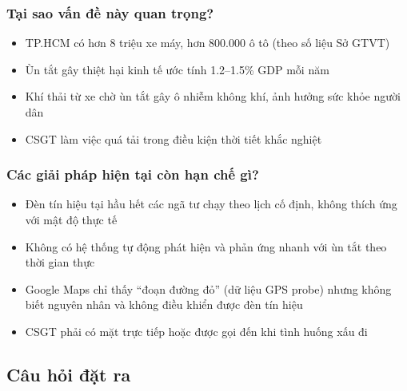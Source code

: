 \documentclass[12pt,a4paper]{article}
\begin{document}
\subsubsection{Tại sao vấn đề này quan trọng?}

\begin{itemize}
    \item TP.HCM có hơn 8 triệu xe máy, hơn 800.000 ô tô (theo số liệu Sở GTVT)
    \item Ùn tắt gây thiệt hại kinh tế ước tính 1.2--1.5\% GDP mỗi năm
    \item Khí thải từ xe chờ ùn tắt gây ô nhiễm không khí, ảnh hưởng sức khỏe người dân
    \item CSGT làm việc quá tải trong điều kiện thời tiết khắc nghiệt
\end{itemize}

\subsubsection{Các giải pháp hiện tại còn hạn chế gì?}

\begin{itemize}
    \item Đèn tín hiệu tại hầu hết các ngã tư chạy theo lịch cố định, không thích ứng với mật độ thực tế
    \item Không có hệ thống tự động phát hiện và phản ứng nhanh với ùn tắt theo thời gian thực
    \item Google Maps chỉ thấy ``đoạn đường đỏ'' (dữ liệu GPS probe) nhưng không biết nguyên nhân và không điều khiển được đèn tín hiệu
    \item CSGT phải có mặt trực tiếp hoặc được gọi đến khi tình huống xấu đi
\end{itemize}

\subsection{Câu hỏi đặt ra}
\end{document}
